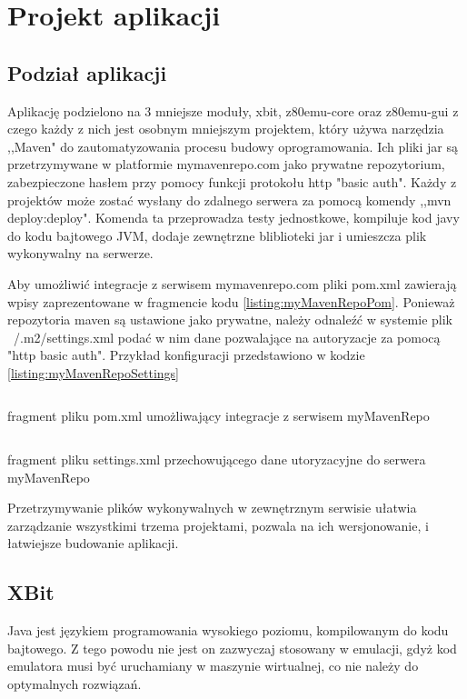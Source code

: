 \chapter{Projekt aplikacji}
	
	\section{Podział aplikacji}
	Aplikację podzielono na 3 mniejsze moduły, xbit, z80emu-core oraz z80emu-gui z czego każdy z nich jest osobnym mniejszym projektem, który używa narzędzia ,,Maven" do zautomatyzowania procesu budowy oprogramowania. Ich pliki jar są przetrzymywane w platformie mymavenrepo.com jako prywatne repozytorium, zabezpieczone hasłem przy pomocy funkcji protokołu http "basic auth". Każdy z projektów może zostać wysłany do zdalnego serwera za pomocą komendy ,,mvn deploy:deploy". Komenda ta przeprowadza testy jednostkowe, kompiluje kod javy do kodu bajtowego JVM, dodaje zewnętrzne bliblioteki jar i umieszcza plik wykonywalny na serwerze.
	
	Aby umożliwić integracje z serwisem mymavenrepo.com pliki pom.xml zawierają wpisy zaprezentowane w fragmencie kodu \ref{listing:myMavenRepoPom}. Ponieważ repozytoria maven są ustawione jako prywatne, należy odnaleźć w systemie plik ~/.m2/settings.xml podać w nim dane pozwalające na autoryzacje za pomocą "http basic auth". Przykład konfiguracji przedstawiono w kodzie \ref{listing:myMavenRepoSettings}
	
	\begin{listing}[h]
		\inputminted{xml}{listings/myMavenRepoPom.xml}
		\caption{fragment pliku pom.xml umożliwający integracje z serwisem myMavenRepo}
		\label{listing:myMavenRepoPom}
	\end{listing}

	\begin{listing}[h]
		\inputminted{xml}{listings/myMavenRepoSettings.xml}
		\caption{fragment pliku settings.xml przechowującego dane utoryzacyjne do serwera myMavenRepo}
		\label{listing:myMavenRepoSettings}
	\end{listing}

	Przetrzymywanie plików wykonywalnych w zewnętrznym serwisie ułatwia zarządzanie wszystkimi trzema projektami, pozwala na ich wersjonowanie, i łatwiejsze budowanie aplikacji. 

	\section{XBit}
	Java jest językiem programowania wysokiego poziomu, kompilowanym do kodu bajtowego. Z tego powodu nie jest on zazwyczaj stosowany w emulacji, gdyż kod emulatora musi być uruchamiany w maszynie wirtualnej, co nie należy do optymalnych rozwiązań.
	
